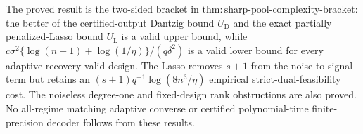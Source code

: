 The proved result is the two-sided bracket in \(\mathrm{thm{:}sharp\text{-}pool\text{-}complexity\text{-}bracket}\): the better of the certified-output Dantzig bound \(U_{\mathrm D}\) and the exact partially penalized-Lasso bound \(U_{\mathrm L}\) is a valid upper bound, while \(c\sigma^2\{\log(n-1)+\log(1/\eta)\}/(q\delta^2)\) is a valid lower bound for every adaptive recovery-valid design.  The Lasso removes \(s+1\) from the noise-to-signal term but retains an \((s+1)q^{-1}\log(8n^3/\eta)\) empirical strict-dual-feasibility cost.  The noiseless degree-one and fixed-design rank obstructions are also proved.  No all-regime matching adaptive converse or certified polynomial-time finite-precision decoder follows from these results.